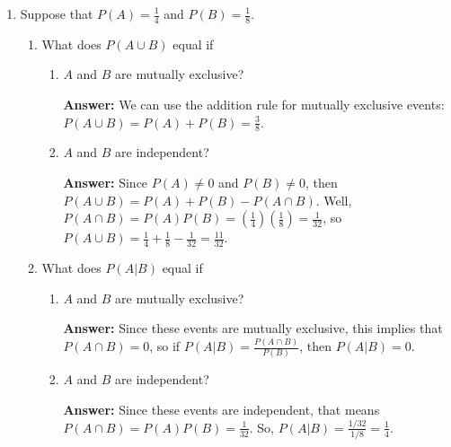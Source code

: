 \documentclass{article}
\begin{document}
\begin{enumerate}
        
        \item Suppose that $P(A) = \tfrac{1}{4}$ and $P(B) = \tfrac{1}{8}$.
            \begin{enumerate}
                \item What does $P(A \cup B)$ equal if 
                    \begin{enumerate}
                        \item $A$ and $B$ are mutually exclusive?
                        
                        \textbf{Answer:} We can use the addition rule for mutually exclusive events: $P(A \cup B) = P(A) + P(B) = \tfrac{3}{8}$.\\
                        
                        \item $A$ and $B$ are independent?
                        
                        \textbf{Answer:} Since $P(A) \neq 0$ and $P(B) \neq 0$, then $P(A \cup B) = P(A)+P(B)-P(A \cap B)$. Well, $P(A \cap B) = P(A)P(B) = (\tfrac{1}{4})(\tfrac{1}{8}) = \tfrac{1}{32}$, so $P(A \cup B) = \tfrac{1}{4}+\tfrac{1}{8}-\tfrac{1}{32} = \tfrac{11}{32}$.\\
                        
                    \end{enumerate}
                    
                \item What does $P(A|B)$ equal if
                    \begin{enumerate}
                        \item $A$ and $B$ are mutually exclusive?
                        
                        \textbf{Answer:} Since these events are mutually exclusive, this implies that $P(A \cap B) = 0$, so if $P(A|B) = \tfrac{P(A \cap B)}{P(B)}$, then $P(A|B) = 0$.\\
                        
                        \item $A$ and $B$ are independent?
                
                        \textbf{Answer:} Since these events are independent, that means $P(A \cap B) = P(A)P(B) = \tfrac{1}{32}$. So, $P(A|B) = \tfrac{1/32}{1/8} = \tfrac{1}{4}$.\\
                        
                \end{enumerate}
            \end{enumerate}
    \end{enumerate}
\end{document}
